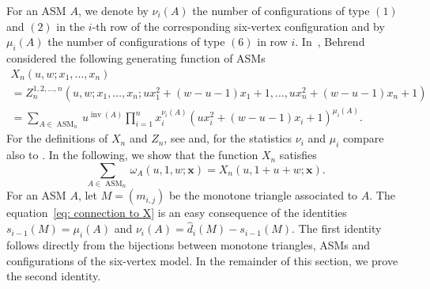 \documentclass[11pt]{article}
\theoremstyle{definition}
\numberwithin{equation}{section}
\newcommand{\x}{\mathbf{x}}
\DeclareMathOperator{\ASM}{ASM}
\DeclareMathOperator{\inv}{inv}
\newcounter{x}
\newcounter{y}
\begin{document}
For an ASM $A$, we denote by $\nu_i(A)$ the number of configurations of type $(1)$ and $(2)$ in the $i$-th row of the corresponding six-vertex configuration and by $\mu_i(A)$ the number of configurations of type $(6)$ in row $i$. 
In~\cite{Behrend13}, Behrend considered the following generating function of ASMs
\begin{multline*}
X_n(u,w;x_1,\ldots,x_n)\\
 = Z_n^{1,2,\ldots,n}(u,w;x_1,\ldots,x_n;u x_1^2 + (w-u-1)x_1+1, \ldots, 	u x_n^2 + (w-u-1)x_n+1) \\
= \sum_{A \in \ASM_n} u^{\inv(A)} \prod_{i=1}^n x_i^{\nu_i(A)} (u x_i^2 + (w-u-1)x_i+1)^{\mu_i(A)}. 
\end{multline*}
For the definitions of $X_n$ and $Z_n$, see \cite[Eqs. 67, 70, 73]{Behrend13} and, for the statistics $\nu_i$ and $\mu_i$ compare also to \cite[Eqs. 113, 2]{Behrend13}. In the following, we show that the function $X_n$ satisfies
\begin{equation}
\label{eq: connection to X}
\sum_{A \in \ASM_n}  \omega_A(u,1,w;\x)  = X_n(u,1+u+w;\x).
\end{equation}
For an ASM $A$, let $M=(m_{i,j})$ be the monotone triangle associated to $A$. The equation~\eqref{eq: connection to X} is an easy consequence of the identities $s_{i-1}(M)=\mu_i(A)$ and $\nu_i(A) = \widehat{d}_i(M)-s_{i-1}(M)$. The first identity follows directly from the bijections between monotone triangles, ASMs and configurations of the six-vertex model. In the remainder of this section, we prove the second identity.
\end{document}

